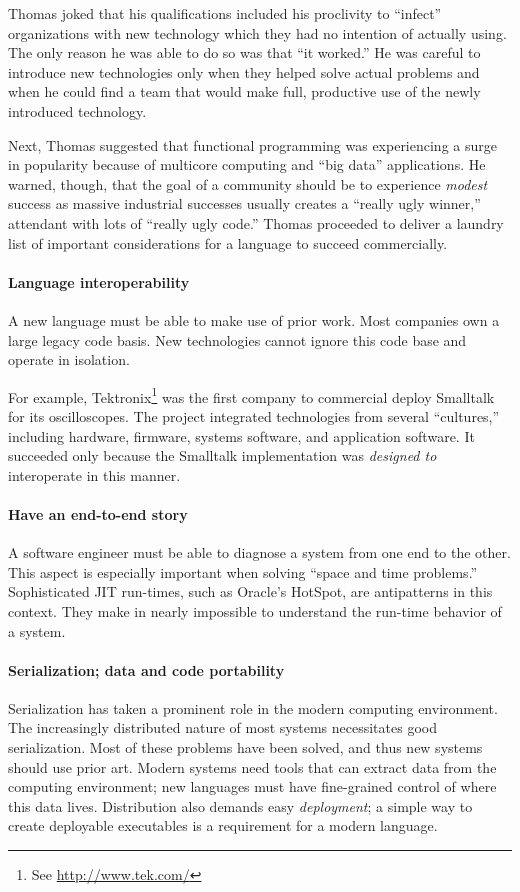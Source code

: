 \documentclass{jfp1}
\begin{document}
Thomas joked that his qualifications included his proclivity to ``infect''
organizations with new technology which they had no intention of actually
using. The only reason he was able to do so was that ``it worked.'' He was
careful to introduce new technologies only when they helped solve actual
problems and when he could find a team that would make full, productive use
of the newly introduced technology.

Next, Thomas suggested that functional programming was experiencing a surge
in popularity because of multicore computing and ``big data''
applications. He warned, though, that the goal of a community should be to
experience \textit{modest} success as massive industrial successes usually
creates a ``really ugly winner,'' attendant with lots of ``really ugly
code.'' Thomas proceeded to deliver a laundry list of important
considerations for a language to succeed commercially.

\paragraph{Language interoperability} A new language must be able to make
use of prior work. Most companies own a large legacy code basis. New
technologies cannot ignore this code base and operate in isolation.  

For example, Tektronix\footnote{See \url{http://www.tek.com/}} was the
first company to commercial deploy Smalltalk for its oscilloscopes. The
project integrated technologies from several ``cultures,'' including
hardware, firmware, systems software, and application software. It
succeeded only because the Smalltalk implementation was {\em designed to\/}
interoperate in this manner.

\paragraph{Have an end-to-end story} A software engineer must be able to
diagnose a system from one end to the other. This aspect is especially
important when solving ``space and time problems.'' Sophisticated JIT
run-times, such as Oracle's HotSpot, are antipatterns in this context. They
make in nearly impossible to understand the run-time behavior of a system.

\paragraph{Serialization; data and code portability} Serialization has
taken a prominent role in the modern computing environment. The
increasingly distributed nature of most systems necessitates good
serialization.  Most of these problems have been solved, and thus new
systems should use prior art. Modern systems need tools that can extract
data from the computing environment; new languages must have fine-grained
control of where this data lives. Distribution also demands easy
\textit{deployment}; a simple way to create deployable executables is a
requirement for a modern language.
\end{document}
